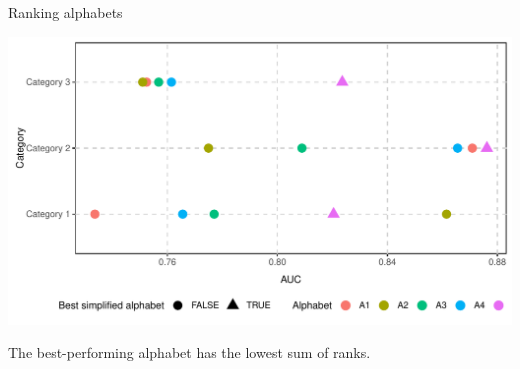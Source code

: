 \documentclass{beamer}\usepackage[]{graphicx}\usepackage[]{color}
\makeatletter
\def\maxwidth{ %
  \ifdim\Gin@nat@width>\linewidth
    \linewidth
  \else
    \Gin@nat@width
  \fi
}
\newenvironment{knitrout}{}{} %
\makeatother
\begin{document}
\begin{frame}{Ranking alphabets}
\begin{knitrout}
\color{fgcolor}

{\centering \includegraphics[width=\maxwidth]{figure/unnamed-chunk-24-1} 

}



\end{knitrout}
The best-performing alphabet has the lowest sum of ranks.  

\end{frame}
\end{document}
